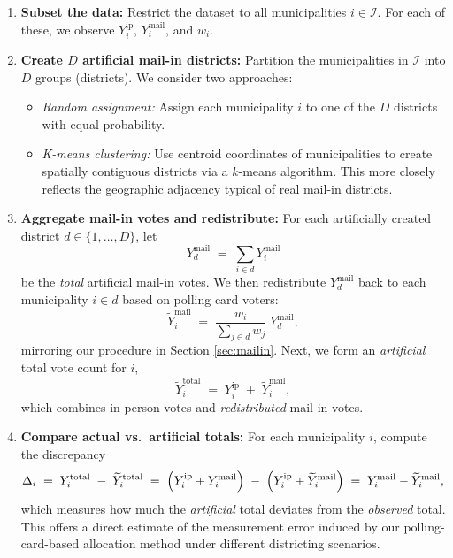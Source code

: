 \documentclass[12pt]{article}
\begin{document}
\begin{enumerate}
    \item \textbf{Subset the data:} Restrict the dataset to all municipalities $i \in \mathcal{I}$. For each of these, we observe $Y_i^{\text{ip}}$, $Y_i^{\text{mail}}$, and $w_i$.

    \item \textbf{Create $D$ artificial mail-in districts:} Partition the municipalities in $\mathcal{I}$ into $D$ groups (districts). We consider two approaches:
    \begin{itemize}
        \item \textit{Random assignment:} Assign each municipality $i$ to one of the $D$ districts with equal probability.
        \item \textit{K-means clustering:} Use centroid coordinates of municipalities to create spatially contiguous districts via a $k$-means algorithm. This more closely reflects the geographic adjacency typical of real mail-in districts.
    \end{itemize}

    \item \textbf{Aggregate mail-in votes and redistribute:} For each artificially created district $d \in \{1,\dots,D\}$, let
    \[
        Y_d^{\text{mail}} \;=\; \sum_{i \in d} Y_i^{\text{mail}}
    \]
    be the \emph{total} artificial mail-in votes. We then redistribute $Y_d^{\text{mail}}$ back to each municipality $i \in d$ based on polling card voters:
    \[
        \widetilde{Y}_i^{\text{mail}} 
        \;=\; 
        \frac{w_i}{\sum_{j \in d} w_j} 
        \; Y_d^{\text{mail}},
    \]
    mirroring our procedure in Section \ref{sec:mailin}. Next, we form an \emph{artificial} total vote count for $i$,
    \[
        \widetilde{Y}_i^{\text{total}} 
        \;=\; 
        Y_i^{\text{ip}} 
        \;+\;
        \widetilde{Y}_i^{\text{mail}},
    \]
    which combines in-person votes and \emph{redistributed} mail-in votes.

    \item \textbf{Compare actual vs.\ artificial totals:} For each municipality $i$, compute the discrepancy
    \[
        \Delta_i 
        \;=\; 
        Y_i^{\text{total}}
        \;-\; 
        \widetilde{Y}_i^{\text{total}}
        \;=\;
        \Bigl(Y_i^{\text{ip}} + Y_i^{\text{mail}}\Bigr)
        \;-\;
        \Bigl(Y_i^{\text{ip}} + \widetilde{Y}_i^{\text{mail}}\Bigr)
        \;=\;
        Y_i^{\text{mail}} - \widetilde{Y}_i^{\text{mail}},
    \]
    which measures how much the \emph{artificial} total deviates from the \emph{observed} total. This offers a direct estimate of the measurement error induced by our polling-card-based allocation method under different districting scenarios.
\end{enumerate}
\end{document}
